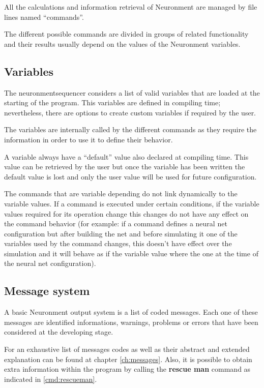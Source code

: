 All the calculations and information retrieval of Neuronment are managed by  file lines named ``commands''.

The different possible commands are divided in groups of related functionality and their results usually depend on the values of the Neuronment variables.

\subsection{Variables}

The \gls{neuronmentsequencer} considers a list of valid variables that are loaded at the starting of the program. This variables are defined in compiling time; nevertheless, there are options to create custom variables if required by the user. \lotharpi

The variables are internally called by the different commands as they require the information in order to use it to define their behavior.

A variable always have a ``default'' value also declared at compiling time. This value can be retrieved by the user but once the variable has been written the default value is lost and only the user value will be used for future configuration.

The commands that are variable depending do not link dynamically to the variable values. If a command is executed under certain conditions, if the variable values required for its operation change this changes do not have any effect on the command behavior (for example: if a command defines a neural net configuration but after building the net and before simulating it one of the variables used by the command changes, this doesn't have effect over the simulation and it will behave as if the variable value where the one at the time of the neural net configuration).

\subsection{Message system}

A basic Neuronment output system is a list of coded messages. Each one of these messages are identified informations, warnings, problems or errors that have been considered at the developing stage.

For an exhaustive list of messages codes as well as their abstract and extended explanation can be found at chapter \ref{ch:messages}. Also, it is possible to obtain extra information within the program by calling the \textbf{rescue man} command as indicated in \ref{cmd:rescueman}. \lotharpi

